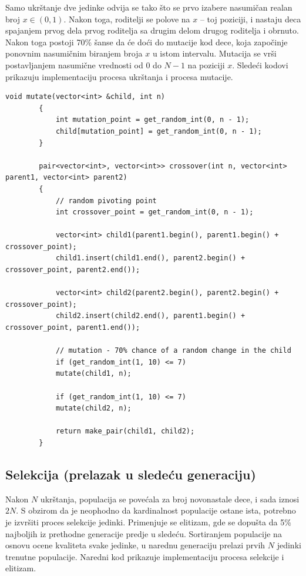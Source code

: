 \documentclass[12pt, a4paper]{article}
\begin{document}
	Samo ukrštanje dve jedinke odvija se tako što se prvo izabere nasumičan realan broj $x\in(0, 1)$. Nakon toga, roditelji se polove na $x$ – toj poziciji, i nastaju deca spajanjem prvog dela prvog roditelja sa drugim delom drugog roditelja i obrnuto. Nakon toga postoji 70\% šanse da će doći do mutacije kod dece, koja započinje ponovnim nasumičnim biranjem broja $x$ u istom intervalu. Mutacija se vrši posta\-vljanjem nasumične vrednosti od 0 do $N-1$ na poziciji $x$. Sledeći kodovi prikazuju implementaciju procesa ukrštanja i procesa mutacije.\\
	
	\begin{lstlisting}[caption={Proces ukrštanja}]
		void mutate(vector<int> &child, int n)
		{
			int mutation_point = get_random_int(0, n - 1);
			child[mutation_point] = get_random_int(0, n - 1);
		}
		
		pair<vector<int>, vector<int>> crossover(int n, vector<int> parent1, vector<int> parent2)
		{
			// random pivoting point
			int crossover_point = get_random_int(0, n - 1);
			
			vector<int> child1(parent1.begin(), parent1.begin() + crossover_point);
			child1.insert(child1.end(), parent2.begin() + crossover_point, parent2.end());
			
			vector<int> child2(parent2.begin(), parent2.begin() + crossover_point);
			child2.insert(child2.end(), parent1.begin() + crossover_point, parent1.end());
			
			// mutation - 70% chance of a random change in the child
			if (get_random_int(1, 10) <= 7)
			mutate(child1, n);
			
			if (get_random_int(1, 10) <= 7)
			mutate(child2, n);
			
			return make_pair(child1, child2);
		}
	\end{lstlisting}
	
	\subsection{Selekcija (prelazak u sledeću generaciju)}
	Nakon $N$ ukrštanja, populacija se povećala za broj novonastale dece, i sada iznosi $2N$. S obzirom da je neophodno da kardinalnost populacije ostane ista, potrebno je izvršiti proces selekcije jedinki. Primenjuje se elitizam, gde se dopušta da 5\% najboljih iz prethodne generacije predje u sledeću. Sortiranjem populacije na osnovu ocene kvaliteta svake jedinke, u narednu generaciju prelazi prvih $N$ jedinki trenutne populacije. Naredni kod prikazuje implementaciju procesa selekcije i elitizam.\\
	
\end{document}
